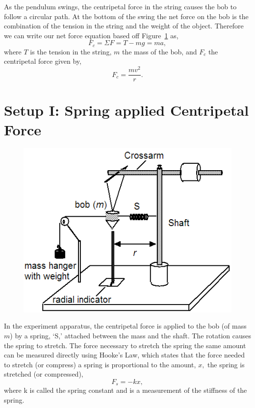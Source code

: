 \documentclass[main.tex]{subfiles}
\begin{document}
\begin{figure}
\centering
{}
\caption{} \label{fig:freebody}
\end{figure}
As the pendulum swings, the centripetal force in the string causes the bob to follow a circular path. At the bottom of the swing the net force on the bob is the combination of the tension in the string and the weight of the object. Therefore we can write our net force equation based off Figure~\ref{fig:freebody} as,
\begin{equation}
F_c=\Sigma F=T-mg=ma,
\end{equation}
where $T$ is the tension in the string, $m$ the mass of the bob, and $F_c$ the centripetal force given by,
\begin{equation} \label{eq:CenForce2}
F_c=\frac{mv^2}{r}.
\end{equation}

\section{Setup I: Spring applied Centripetal Force}
\begin{figure}[h]
\centering
\includegraphics{CenForce_1_Setup} \label{page:CenForce_1_Setup}
\end{figure}

In the experiment apparatus, the centripetal force is applied to the bob (of mass $m$) by a spring, `S,' attached between the mass and the shaft.  The rotation causes the spring to stretch. The force necessary to stretch the spring the same amount can be measured directly using Hooke's Law, which states that the force needed to stretch (or compress) a spring is proportional to the amount, $x,$ the spring is stretched (or compressed),
\[
F_s=-kx,
\]
where k is called the spring constant and is a measurement of the stiffness of the spring.
\end{document}
